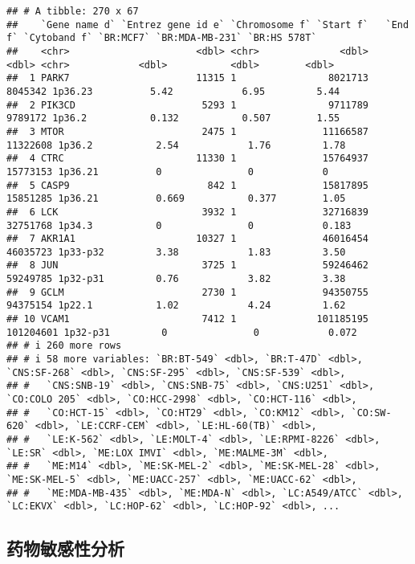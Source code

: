 \documentclass[
]{article}
\begin{document}
\begin{verbatim}
## # A tibble: 270 x 67
##    `Gene name d` `Entrez gene id e` `Chromosome f` `Start f`   `End f` `Cytoband f` `BR:MCF7` `BR:MDA-MB-231` `BR:HS 578T`
##    <chr>                      <dbl> <chr>              <dbl>     <dbl> <chr>            <dbl>           <dbl>        <dbl>
##  1 PARK7                      11315 1                8021713   8045342 1p36.23          5.42            6.95         5.44 
##  2 PIK3CD                      5293 1                9711789   9789172 1p36.2           0.132           0.507        1.55 
##  3 MTOR                        2475 1               11166587  11322608 1p36.2           2.54            1.76         1.78 
##  4 CTRC                       11330 1               15764937  15773153 1p36.21          0               0            0    
##  5 CASP9                        842 1               15817895  15851285 1p36.21          0.669           0.377        1.05 
##  6 LCK                         3932 1               32716839  32751768 1p34.3           0               0            0.183
##  7 AKR1A1                     10327 1               46016454  46035723 1p33-p32         3.38            1.83         3.50 
##  8 JUN                         3725 1               59246462  59249785 1p32-p31         0.76            3.82         3.38 
##  9 GCLM                        2730 1               94350755  94375154 1p22.1           1.02            4.24         1.62 
## 10 VCAM1                       7412 1              101185195 101204601 1p32-p31         0               0            0.072
## # i 260 more rows
## # i 58 more variables: `BR:BT-549` <dbl>, `BR:T-47D` <dbl>, `CNS:SF-268` <dbl>, `CNS:SF-295` <dbl>, `CNS:SF-539` <dbl>,
## #   `CNS:SNB-19` <dbl>, `CNS:SNB-75` <dbl>, `CNS:U251` <dbl>, `CO:COLO 205` <dbl>, `CO:HCC-2998` <dbl>, `CO:HCT-116` <dbl>,
## #   `CO:HCT-15` <dbl>, `CO:HT29` <dbl>, `CO:KM12` <dbl>, `CO:SW-620` <dbl>, `LE:CCRF-CEM` <dbl>, `LE:HL-60(TB)` <dbl>,
## #   `LE:K-562` <dbl>, `LE:MOLT-4` <dbl>, `LE:RPMI-8226` <dbl>, `LE:SR` <dbl>, `ME:LOX IMVI` <dbl>, `ME:MALME-3M` <dbl>,
## #   `ME:M14` <dbl>, `ME:SK-MEL-2` <dbl>, `ME:SK-MEL-28` <dbl>, `ME:SK-MEL-5` <dbl>, `ME:UACC-257` <dbl>, `ME:UACC-62` <dbl>,
## #   `ME:MDA-MB-435` <dbl>, `ME:MDA-N` <dbl>, `LC:A549/ATCC` <dbl>, `LC:EKVX` <dbl>, `LC:HOP-62` <dbl>, `LC:HOP-92` <dbl>, ...
\end{verbatim}

\hypertarget{ux836fux7269ux654fux611fux6027ux5206ux6790}{%
\subsection{药物敏感性分析}\label{ux836fux7269ux654fux611fux6027ux5206ux6790}}
\end{document}
